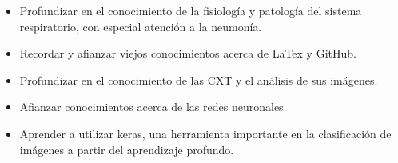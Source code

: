 \begin{itemize}
    \item Profundizar en el conocimiento de la fisiología y patología del sistema respiratorio, con especial atención a la neumonía.
    \item Recordar y afianzar viejos conocimientos acerca de LaTex y GitHub.
    \item Profundizar en el conocimiento de las CXT y el análisis de sus imágenes.
    \item Afianzar conocimientos acerca de las redes neuronales.
    \item Aprender a utilizar keras, una herramienta importante en la clasificación de imágenes a partir del aprendizaje profundo.
\end{itemize}























